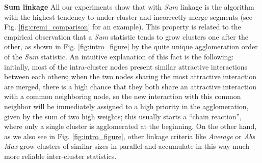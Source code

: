 \textbf{Sum linkage } 
All our experiments show that \algname{} with \emph{Sum} linkage is the algorithm with the highest tendency to under-cluster and incorrectly merge segments (see Fig. \ref{fig:cremi_comparison} for an example). This property is related to the empirical observation that a \emph{Sum} statistic tends to grow clusters one after the other, as shown in Fig. \ref{fig:intro_figure} by the quite unique agglomeration order of the \emph{Sum} statistic. An intuitive explanation of this fact is the following: initially, most of the intra-cluster nodes present similar attractive interactions between each others; when the two nodes sharing the most attractive interaction are merged, there is a high chance that they both share an attractive interaction with a common neighboring node, so the new interaction with this common neighbor will be immediately assigned to a high priority in the agglomeration, given by the sum of two high weights; this usually starts a ``chain reaction'', where only a single cluster is agglomerated at the beginning. On the other hand, as we also see in Fig. \ref{fig:intro_figure}, other linkage criteria like \emph{Average} or \emph{Abs Max} grow clusters of similar sizes in parallel and accumulate in this way much more reliable inter-cluster statistics.





